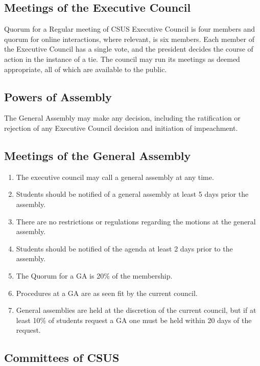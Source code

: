 \subsection{Meetings of the Executive
Council}\label{meetings-of-the-executive-council}

Quorum for a Regular meeting of CSUS Executive Council is four members
and quorum for online interactions, where relevant, is six members. Each
member of the Executive Council has a single vote, and the president
decides the course of action in the instance of a tie. The council may
run its meetings as deemed appropriate, all of which are available to
the public.

\subsection{Powers of Assembly}\label{powers-of-assembly}

The General Assembly may make any decision, including the ratification
or rejection of any Executive Council decision and initiation of
impeachment.

\subsection{Meetings of the General
Assembly}\label{meetings-of-the-general-assembly}

\begin{enumerate}
\def\labelenumi{\arabic{enumi}.}
\item
  The executive council may call a general assembly at any time.
\item
  Students should be notified of a general assembly at least 5 days
  prior the assembly.
\item
  There are no restrictions or regulations regarding the motions at the
  general assembly.
\item
  Students should be notified of the agenda at least 2 days prior to the
  assembly.
\item
  The Quorum for a GA is 20\% of the membership.
\item
  Procedures at a GA are as seen fit by the current council.
\item
  General assemblies are held at the discretion of the current council,
  but if at least 10\% of students request a GA one must be held within
  20 days of the request.
\end{enumerate}

\subsection{Committees of CSUS}\label{committees-of-csus}

